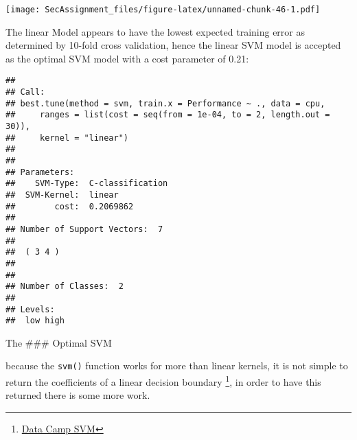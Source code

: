 \documentclass[12pt]{article}
\newenvironment{Shaded}{\begin{snugshade}}{\end{snugshade}}
\newcommand{\CommentTok}[1]{\textcolor[rgb]{0.56,0.35,0.01}{\textit{#1}}}
\newcommand{\DataTypeTok}[1]{\textcolor[rgb]{0.13,0.29,0.53}{#1}}
\newcommand{\DecValTok}[1]{\textcolor[rgb]{0.00,0.00,0.81}{#1}}
\newcommand{\FloatTok}[1]{\textcolor[rgb]{0.00,0.00,0.81}{#1}}
\newcommand{\KeywordTok}[1]{\textcolor[rgb]{0.13,0.29,0.53}{\textbf{#1}}}
\newcommand{\NormalTok}[1]{#1}
\newcommand{\OperatorTok}[1]{\textcolor[rgb]{0.81,0.36,0.00}{\textbf{#1}}}
\newcommand{\OtherTok}[1]{\textcolor[rgb]{0.56,0.35,0.01}{#1}}
\newcommand{\StringTok}[1]{\textcolor[rgb]{0.31,0.60,0.02}{#1}}
\let\rmarkdownfootnote\footnote%
\def\footnote{\protect\rmarkdownfootnote}
\begin{document}
\texttt{[image: SecAssignment\_files/figure-latex/unnamed-chunk-46-1.pdf]}

The linear Model appears to have the lowest expected training error as
determined by 10-fold cross validation, hence the linear SVM model is
accepted as the optimal SVM model with a cost parameter of 0.21:

\begin{Shaded}
\end{Shaded}

\begin{verbatim}
## 
## Call:
## best.tune(method = svm, train.x = Performance ~ ., data = cpu, 
##     ranges = list(cost = seq(from = 1e-04, to = 2, length.out = 30)), 
##     kernel = "linear")
## 
## 
## Parameters:
##    SVM-Type:  C-classification 
##  SVM-Kernel:  linear 
##        cost:  0.2069862 
## 
## Number of Support Vectors:  7
## 
##  ( 3 4 )
## 
## 
## Number of Classes:  2 
## 
## Levels: 
##  low high
\end{verbatim}

The \#\#\# Optimal SVM

because the \texttt{svm()} function works for more than linear kernels,
it is not simple to return the coefficients of a linear decision
boundary \footnote{\href{https://www.datacamp.com/community/tutorials/support-vector-machines-r}{Data
  Camp SVM}}, in order to have this returned there is some more work.
\end{document}
